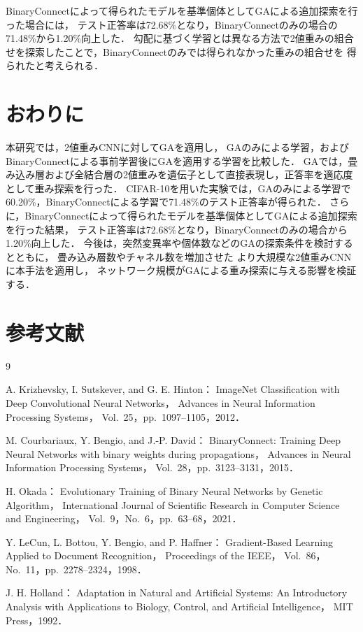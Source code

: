 \documentclass[a4paper]{jarticle}
\begin{document}
BinaryConnectによって得られたモデルを基準個体としてGAによる追加探索を行った場合には，
テスト正答率は72.68\%となり，BinaryConnectのみの場合の71.48\%から1.20\%向上した．
勾配に基づく学習とは異なる方法で2値重みの組合せを探索したことで，BinaryConnectのみでは得られなかった重みの組合せを
得られたと考えられる．


\section{おわりに}
本研究では，2値重みCNNに対してGAを適用し，
GAのみによる学習，およびBinaryConnectによる事前学習後にGAを適用する学習を比較した．
GAでは，畳み込み層および全結合層の2値重みを遺伝子として直接表現し，正答率を適応度として重み探索を行った．
CIFAR-10を用いた実験では，GAのみによる学習で60.20\%，BinaryConnectによる学習で71.48\%のテスト正答率が得られた．
さらに，BinaryConnectによって得られたモデルを基準個体としてGAによる追加探索を行った結果，
テスト正答率は72.68\%となり，BinaryConnectのみの場合から1.20\%向上した．
今後は，突然変異率や個体数などのGAの探索条件を検討するとともに，
畳み込み層数やチャネル数を増加させた
より大規模な2値重みCNNに本手法を適用し，
ネットワーク規模がGAによる重み探索に与える影響を検証する．



\section{参考文献}
\begin{thebibliography}{9}

A. Krizhevsky, I. Sutskever, and G. E. Hinton：
ImageNet Classification with Deep Convolutional Neural Networks，
Advances in Neural Information Processing Systems，
Vol.~25，pp.~1097--1105，2012．

M. Courbariaux, Y. Bengio, and J.-P. David：
BinaryConnect: Training Deep Neural Networks with
binary weights during propagations，
Advances in Neural Information Processing Systems，
Vol.~28，pp.~3123--3131，2015．

H. Okada：
Evolutionary Training of Binary Neural Networks by Genetic Algorithm，
International Journal of Scientific Research in
Computer Science and Engineering，
Vol.~9，No.~6，pp.~63--68，2021．

Y. LeCun, L. Bottou, Y. Bengio, and P. Haffner：
Gradient-Based Learning Applied to Document Recognition，
Proceedings of the IEEE，
Vol.~86，No.~11，pp.~2278--2324，1998．

J. H. Holland：
Adaptation in Natural and Artificial Systems:
An Introductory Analysis with Applications to Biology,
Control, and Artificial Intelligence，
MIT Press，1992．

\end{thebibliography}
\end{document}
